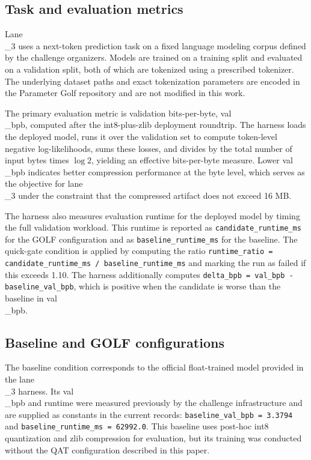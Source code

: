 \documentclass{article}
\begin{document}
\subsection{Task and evaluation metrics}

\label{sec:task_and_evaluation_metrics}

Lane\\_3 uses a next-token prediction task on a fixed language modeling corpus defined by the challenge organizers. Models are trained on a training split and evaluated on a validation split, both of which are tokenized using a prescribed tokenizer. The underlying dataset paths and exact tokenization parameters are encoded in the Parameter Golf repository and are not modified in this work.

The primary evaluation metric is validation bits-per-byte, val\\_bpb, computed after the int8-plus-zlib deployment roundtrip. The harness loads the deployed model, runs it over the validation set to compute token-level negative log-likelihoods, sums these losses, and divides by the total number of input bytes times \(\log 2\), yielding an effective bits-per-byte measure. Lower val\\_bpb indicates better compression performance at the byte level, which serves as the objective for lane\\_3 under the constraint that the compressed artifact does not exceed 16 MB.

The harness also measures evaluation runtime for the deployed model by timing the full validation workload. This runtime is reported as \texttt{candidate\_runtime\_ms} for the GOLF configuration and as \texttt{baseline\_runtime\_ms} for the baseline. The quick-gate condition is applied by computing the ratio \texttt{runtime\_ratio = candidate\_runtime\_ms / baseline\_runtime\_ms} and marking the run as failed if this exceeds 1.10. The harness additionally computes \texttt{delta\_bpb = val\_bpb - baseline\_val\_bpb}, which is positive when the candidate is worse than the baseline in val\\_bpb.

\subsection{Baseline and GOLF configurations}

\label{sec:baseline_and_golf_configurations}

The baseline condition corresponds to the official float-trained model provided in the lane\\_3 harness. Its val\\_bpb and runtime were measured previously by the challenge infrastructure and are supplied as constants in the current records: \texttt{baseline\_val\_bpb = 3.3794} and \texttt{baseline\_runtime\_ms = 62992.0}. This baseline uses post-hoc int8 quantization and zlib compression for evaluation, but its training was conducted without the QAT configuration described in this paper.
\end{document}
